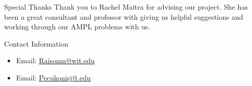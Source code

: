 \documentclass[final]{beamer}
\newlength{\onecolwid}
\begin{document}
\begin{frame}[t]
\begin{columns}[t]
\begin{column}{\onecolwid}
\begin{block}{Special Thanks}
{\small
Thank you to Rachel Maitra for advising our project.  She has been a great consultant and professor with giving us helpful suggestions and working through our AMPL problems with us.  
}
\end{block}



\begin{alertblock}{Contact Information}

\begin{itemize}
\item Email: \href{mailto:Raisonm@wit.edu}{Raisonm@wit.edu}
\item Email: \href{mailto: Pecukonisj@wit.edu}{Pecukonisj@.edu}
\end{itemize}

\end{alertblock}




\end{column} %

\end{columns} %

\end{frame} %
\end{document}
